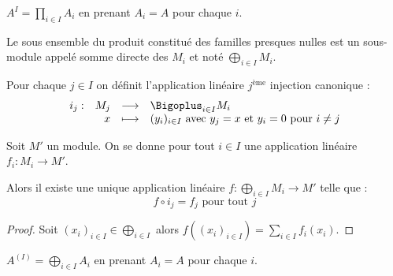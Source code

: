\begin{example}[Remarque]
 $A^I = \prod_{i\in I} A_i$ en prenant $A_i = A$ pour chaque $i$.
\end{example}

\begin{defi}
 
 Le sous ensemble du produit constitué des familles presques nulles est un
sous-module appelé somme directe des $M_i$ et noté $\bigoplus_{i\in I} M_i$.
\end{defi}

\begin{defi}

Pour chaque $j\in I$ on définit l'application linéaire
$j^{\text{ème}}$ injection canonique :
\begin{displaymath} \begin{array}{rrcl}
i_j : &M_j &\longrightarrow& \Bigoplus_{i\in I} M_i \\
      & x  &\longmapsto    & (y_i)_{i\in I} \text{ avec }y_j = x \text{ et }
y_i = 0 \text{ pour } i\neq j
\end{array} \end{displaymath}
\end{defi}

\begin{prop}
 
 Soit $M'$ un module. On se donne pour tout $i\in I$ une application linéaire
$f_i : M_i \rightarrow M'$.

Alors il existe une unique application linéaire $f : \bigoplus_{i\in I} M_i
\rightarrow M'$ telle que :
\begin{displaymath}
 f\circ i_j = f_j \text{ pour tout }j
\end{displaymath}
\end{prop}

\begin{proof}
 Soit $(x_i)_{i\in I} \in \bigoplus_{i\in I}$ alors $f((x_i)_{i\in I}) =
\sum_{i\in I} f_i (x_i)$.
\end{proof}

\begin{example}[Remarque]
 $A^{(I)} = \bigoplus_{i\in I} A_i$ en prenant $A_i = A$ pour chaque $i$.
\end{example}


